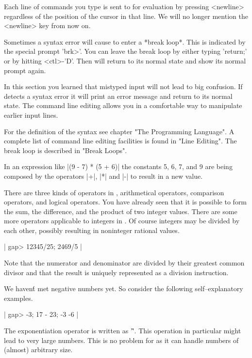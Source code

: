 Each  line  of commands you  type  is  sent to  {\GAP} for  evaluation by
pressing <newline> regardless of the position of the cursor in that line.
We will no longer mention the <newline> key from now on.

Sometimes a syntax error will cause {\GAP} to enter a *break loop*.  This
is indicated by the special prompt 'brk>'.  You can leave  the break loop
by either typing 'return;'  or  by hitting  <ctl>-'D'.  Then  {\GAP} will
return to its normal state and show its normal prompt again.

In  this section you learned that mistyped  input will  not  lead to  big
confusion.   If  {\GAP} detects a syntax  error  it will print  an  error
message and return  to its normal state.  The command line editing allows
you in a comfortable way to manipulate earlier input lines.

For  the  definition  of the {\GAP}  syntax  see chapter "The Programming
Language".  A complete list of command line editing facilities  is  found
in "Line Editing".  The break loop is described in "Break Loops".


In an expression like  |(9 - 7) * (5 +  6)| the constants  5, 6, 7, and 9
are being composed by the operators |+|, |*| and |-|  to result in a  new
value.

There are  three kinds  of operators in  {\GAP}, arithmetical  operators,
comparison operators, and logical operators.  You  have already seen that
it is possible to form  the sum,  the  difference, and the product of two
integer values.  There are some  more operators applicable to integers in
{\GAP}.   Of  course integers  may  be divided  by  each other,  possibly
resulting in noninteger rational values.

|    gap> 12345/25;
    2469/5 |

Note  that  the numerator and denominator  are divided by their  greatest
common divisor  and that the result is uniquely represented as a division
instruction.

We  haven\'t  met  negative  numbers  yet.   So  consider  the  following
self--explanatory examples.

|    gap> -3; 17 - 23;
    -3
    -6 |

The exponentiation  operator  is  written  as  '\^'.   This  operation in
particular might lead to  very  large  numbers.  This  is  no problem for
{\GAP} as it can handle numbers of (almost) arbitrary size.

